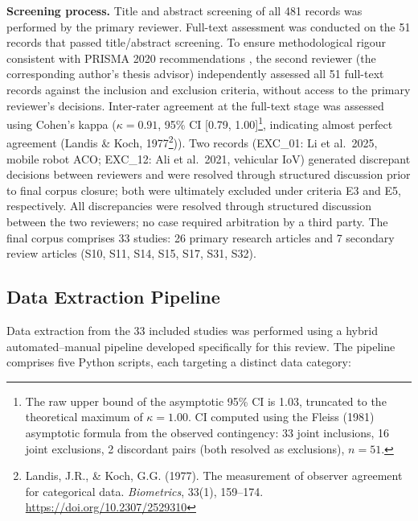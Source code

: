\documentclass[review,3p,times]{elsarticle}
\begin{document}
\textbf{Screening process.} Title and abstract screening of all 481 records was performed by the primary reviewer. Full-text assessment was conducted on the 51 records that passed title/abstract screening. To ensure methodological rigour consistent with PRISMA 2020 recommendations \cite{page2021}, the second reviewer (the corresponding author's thesis advisor) independently assessed all 51 full-text records against the inclusion and exclusion criteria, without access to the primary reviewer's decisions. Inter-rater agreement at the full-text stage was assessed using Cohen's kappa ($\kappa=0.91$, 95\% CI [0.79, 1.00]\footnote{The raw upper bound of the asymptotic 95\% CI is 1.03, truncated to the theoretical maximum of $\kappa=1.00$. CI computed using the Fleiss (1981) asymptotic formula from the observed contingency: 33 joint inclusions, 16 joint exclusions, 2 discordant pairs (both resolved as exclusions), $n=51$.}, indicating almost perfect agreement (Landis \& Koch, 1977\footnote{Landis, J.R., \& Koch, G.G. (1977). The measurement of observer agreement for categorical data. \textit{Biometrics}, 33(1), 159--174. \url{https://doi.org/10.2307/2529310}})). Two records (EXC\_01: Li et al.\ 2025, mobile robot ACO; EXC\_12: Ali et al.\ 2021, vehicular IoV) generated discrepant decisions between reviewers and were resolved through structured discussion prior to final corpus closure; both were ultimately excluded under criteria E3 and E5, respectively. All discrepancies were resolved through structured discussion between the two reviewers; no case required arbitration by a third party. The final corpus comprises 33 studies: 26 primary research articles and 7 secondary review articles (S10, S11, S14, S15, S17, S31, S32).

\subsection{Data Extraction Pipeline}

Data extraction from the 33 included studies was performed using a hybrid automated--manual pipeline developed specifically for this review. The pipeline comprises five Python scripts, each targeting a distinct data category:
\end{document}
